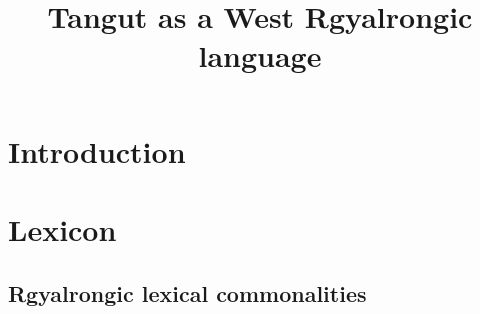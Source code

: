 \documentclass[oneside,a4paper,11pt]{article}
\begin{document}
 
 
 \title{Tangut as a West Rgyalrongic language}
 \maketitle 
 
\section*{Introduction}

\citet{jackson00sidaba, jackson00puxi}

\section{Lexicon} 
\citet{jacques14esquisse}
\subsection{Rgyalrongic lexical commonalities}
\end{document}
